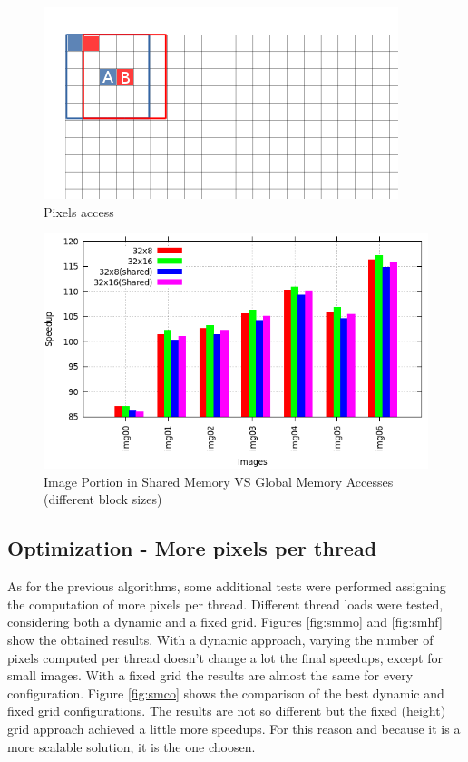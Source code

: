 \documentclass[a4paper]{article}
\begin{document}
\begin{figure}[!ht]
    \centering
    \includegraphics[width=0.5\linewidth]{grid_smooth_colored}
    \caption{Pixels access}
    \label{fig:smoothpa}
\end{figure}
\FloatBarrier

\begin{figure}[!ht]
    \centering
    \includegraphics[width=0.7\linewidth]{res/new/smooth_shared_no}
    \caption{Image Portion in Shared Memory VS Global Memory Accesses (different block sizes)}
    \label{fig:smoothsn}
\end{figure}
\FloatBarrier

\subsection{Optimization - More pixels per thread}
\label{sec:sop}
As for the previous algorithms, some additional tests were performed assigning the computation of more pixels per thread. Different thread loads were tested, considering both a dynamic and a fixed grid. Figures \ref{fig:smmo} and \ref{fig:smhf} show the obtained results. With a dynamic approach, varying the number of pixels computed per thread doesn't change a lot the final speedups, except for small images. With a fixed grid the results are almost the same for every configuration. Figure \ref{fig:smco} shows the comparison of the best dynamic and fixed grid configurations. The results are not so different but the fixed (height) grid approach achieved a little more speedups. For this reason and because it is a more scalable solution, it is the one choosen.
\end{document}
